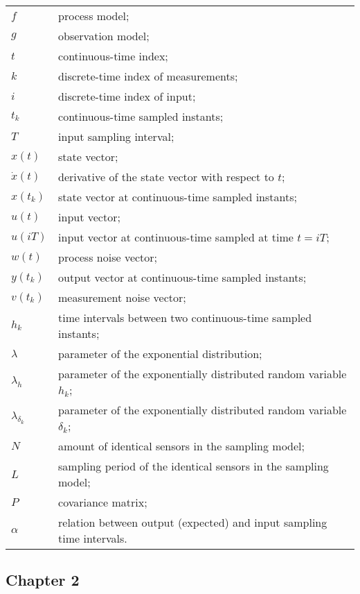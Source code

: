 \begin{longtable}{ll}
	$f$						& process model; \\
	$g$						& observation model; \\
	$t$						& continuous-time index; \\
	$k$						& discrete-time index of measurements; \\
	$i$						& discrete-time index of input; \\
	$t_k$					& continuous-time sampled instants; \\
	$T$						& input sampling interval; \\
	$x(t)$					& state vector; \\
	$\dot{x}(t)$			& derivative of the state vector with respect to $t$; \\
	$x(t_k)$				& state vector at continuous-time sampled instants; \\
	$u(t)$					& input vector; \\
	$u(iT)$					& input vector at continuous-time sampled at time $t = iT$; \\						
	$w(t)$					& process noise vector; \\
	$y(t_k)$            	& output vector at continuous-time sampled instants;\\
	$v(t_k)$				& measurement noise vector; \\
	$h_k$					& time intervals between two continuous-time sampled instants; \\
	$\lambda$ 				& parameter of the exponential distribution; \\
	$\lambda_h$				& parameter of the exponentially distributed random variable $h_k$; \\
	$\lambda_{\delta_{k}}$	& parameter of the exponentially distributed random variable $\delta_{k}$; \\
	$N$						& amount of identical sensors in the sampling model; \\
	$L$						& sampling period of the identical sensors in the sampling model; \\
	$P$						& covariance matrix; \\
	$\alpha$				& relation between output (expected) and input sampling time intervals. \\
\end{longtable}

\subsection*{Chapter 2}

